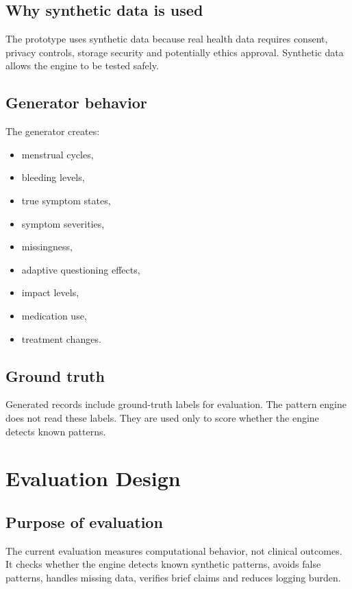 \documentclass[11pt,a4paper]{article}
\begin{document}
\subsection{Why synthetic data is used}

The prototype uses synthetic data because real health data requires consent, privacy controls, storage security and potentially ethics approval. Synthetic data allows the engine to be tested safely.

\subsection{Generator behavior}

The generator creates:

\begin{itemize}
  \item menstrual cycles,
  \item bleeding levels,
  \item true symptom states,
  \item symptom severities,
  \item missingness,
  \item adaptive questioning effects,
  \item impact levels,
  \item medication use,
  \item treatment changes.
\end{itemize}

\subsection{Ground truth}

Generated records include ground-truth labels for evaluation. The pattern engine does not read these labels. They are used only to score whether the engine detects known patterns.

\section{Evaluation Design}

\subsection{Purpose of evaluation}

The current evaluation measures computational behavior, not clinical outcomes. It checks whether the engine detects known synthetic patterns, avoids false patterns, handles missing data, verifies brief claims and reduces logging burden.
\end{document}
